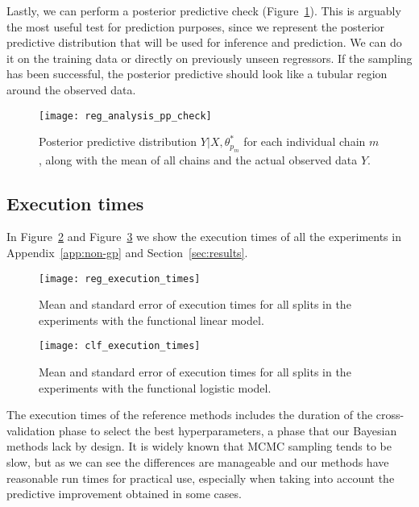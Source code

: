 Lastly, we can perform a posterior predictive check (Figure~\ref{fig:pp-check}). This is arguably the most useful test for prediction purposes, since we represent the posterior predictive distribution that will be used for inference and prediction. We can do it on the training data or directly on previously unseen regressors. If the sampling has been successful, the posterior predictive should look like a tubular region around the observed data.

\enlargethispage{4\baselineskip}
\begin{figure}[ht!]
  \centering
  \texttt{[image: reg\_analysis\_pp\_check]}
  \caption{Posterior predictive distribution \(Y|X, \theta_{p_m}^*\) for each individual chain \(m\), along with the mean of all chains and the actual observed data \(Y\).}\label{fig:pp-check}
\end{figure}

\FloatBarrier{}

\subsection{Execution times}\label{app:execution-times}

In Figure~\ref{fig:reg-execution-times} and Figure~\ref{fig:clf-execution-times} we show the execution times of all the experiments in Appendix~\ref{app:non-gp} and Section~\ref{sec:results}. 

\begin{figure}[ht!]
  \centering
  \texttt{[image: reg\_execution\_times]}
  \caption{Mean and standard error of execution times for all splits in the experiments with the functional linear model.}\label{fig:reg-execution-times}
\end{figure}

\begin{figure}[ht!]
  \centering
  \texttt{[image: clf\_execution\_times]}
  \caption{Mean and standard error of execution times for all splits in the experiments with the functional logistic model.}\label{fig:clf-execution-times}
\end{figure}

The execution times of the reference methods includes the duration of the cross-validation phase to select the best hyperparameters, a phase that our Bayesian methods lack by design. It is widely known that MCMC sampling tends to be slow, but as we can see the differences are manageable and our methods have reasonable run times for practical use, especially when taking into account the predictive improvement obtained in some cases. 

